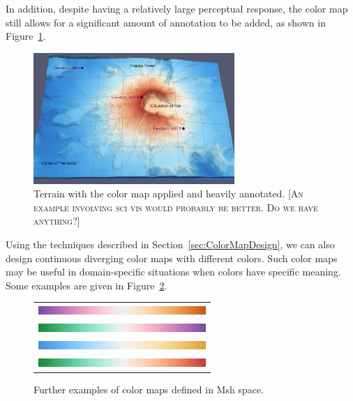 \documentclass{vgtc}                          %
\newcommand{\sticky}[1]{\textsc{[#1]}}
\newcommand{\Msh}{Msh\xspace}
\begin{document}
In addition, despite having a relatively large perceptual response, the
color map still allows for a significant amount of annotation to be added, as
shown in Figure~\ref{fig:ColorMapWithAnnotation}.

\begin{figure}
  \centering
  \includegraphics[width=3in]{images/AnnotationExample}
  \caption{Terrain with the color map applied and heavily annotated. \sticky{An example involving sci vis would probably be better.  Do we have anything?}}
  \label{fig:ColorMapWithAnnotation}
\end{figure}

Using the techniques described in Section~\ref{sec:ColorMapDesign}, we can
also design continuous diverging color maps with different colors.  Such
color maps may be useful in domain-specific situations when colors have
specific meaning.  Some examples are given in
Figure~\ref{fig:OtherColorMaps}.

\begin{figure}
  \centering
  \begin{tabular}{c}
    \includegraphics[width=2.5in]{images/Purple2OrangeBar} \\
    \includegraphics[width=2.5in]{images/Green2PurpleBar} \\
    \includegraphics[width=2.5in]{images/Blue2TanBar} \\
    \includegraphics[width=2.5in]{images/Green2RedDivBar}
  \end{tabular}
  \caption{Further examples of color maps defined in \Msh space.}
  \label{fig:OtherColorMaps}
\end{figure}
\end{document}
